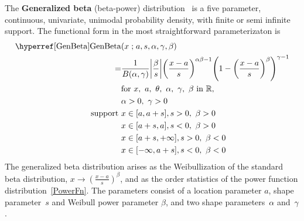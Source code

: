 


\label{sec:GenBeta}
{} 

The {\bf Generalized beta} (beta-power)  distribution~\cite{McDonald1984} is a five parameter,  continuous, univariate, unimodal probability density, with finite or semi infinite support. The functional form in the most straightforward parameterizaton is
\begin{align}
\label{GenBeta}
\opr{GenBeta}&(x\given a,s,\alpha, \gamma,\beta) 
\\    = & 
 \frac{1}{B(\alpha, \gamma)} \Left|\frac{\beta}{s}\Right|
\Left(\frac{x-a}{s} \Right)^{\alpha \beta -1} \Left (1-\Left(\frac{x-a}{s}\Right)^\beta\Right)^{\gamma -1}
\notag
\checked
\\
& \text{for } x,\ a,\ \theta,\ \alpha,\ \gamma,\ \beta\  \text{in } \mathbb{R}, 
\notag
\\ & \alpha>0, \  \gamma >0
\notag
 \\ \text{ support } \checked & x \in [a,a+s], s>0,\ \beta>0 \notag
  \\  &  x\in[a+s,a], s<0,\ \beta>0 
 \notag 
 \\  \notag  &  x\in[a+s,+\infty], s>0,\ \beta<0 
 \\  \notag  &  x\in[-\infty,a+s], s<0,\ \beta<0 
\notag
\end{align}
The generalized beta distribution arises as the Weibullization of the standard beta distribution, $x\rightarrow (\tfrac{x-a}{s})^{\beta}$, and as the order statistics of the power function distribution~\eqref{PowerFn}. The parameters consist of a location parameter $a$, shape parameter~$s$ and Weibull power parameter $\beta$, and two shape parameters~$\alpha$ and~$\gamma$.




